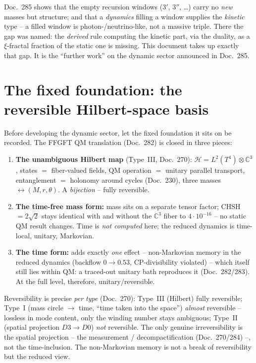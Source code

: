 Doc.~285 shows that the empty recursion windows ($3'$, $3''$, \dots) carry no \emph{new} masses but
structure; and that a \emph{dynamics} filling a window supplies the \emph{kinetic} type -- a filled
window is photon-/neutrino-like, not a massive triple. There the gap was named: the \emph{derived}
rule computing the kinetic part, via the duality, as a $\xi$-fractal fraction of the static one is
missing. This document takes up exactly that gap. It is the \enquote{further work} on the dynamic
sector announced in Doc.~285.

\section{The fixed foundation: the reversible Hilbert-space basis}
Before developing the dynamic sector, let the fixed foundation it sits on be recorded. The FFGFT QM
translation (Doc.~282) is closed in three pieces:
\begin{enumerate}
  \item \textbf{The unambiguous Hilbert map} (Type~III, Doc.~270): $\mathcal H=L^2(T^4)\otimes
  \mathbb C^3$, states $=$ fiber-valued fields, QM operation $=$ unitary parallel transport,
  entanglement $=$ holonomy around cycles (Doc.~230), three masses $\leftrightarrow(M,r,\theta)$. A
  \emph{bijection} -- fully reversible.
  \item \textbf{The time-free mass form:} mass sits on a separate tensor factor; CHSH $=2\sqrt2$
  stays identical with and without the $\mathbb C^3$ fiber to $4\cdot10^{-16}$ -- no static QM result
  changes. Time is \emph{not computed} here; the reduced dynamics is time-local, unitary, Markovian.
  \item \textbf{The time form:} adds exactly \emph{one} effect -- non-Markovian memory in the reduced
  dynamics (backflow $0\to0.53$, CP-divisibility violated) -- which itself still lies within QM: a
  traced-out unitary bath reproduces it (Doc.~282/283). At the full level, therefore, unitary/reversible.
\end{enumerate}
Reversibility is precise \emph{per type} (Doc.~270): Type~III (Hilbert) fully reversible; Type~I
(mass circle $\to$ time, \enquote{time taken into the space}) \emph{almost} reversible -- lossless in
mode content, only the winding number stays ambiguous; Type~II (spatial projection $D3\!\to\!D0$)
\emph{not} reversible. The only genuine irreversibility is the spatial projection -- the measurement /
decompactification (Doc.~270/284) --, not the time-inclusion. The non-Markovian memory is not a break
of reversibility but the reduced view.

